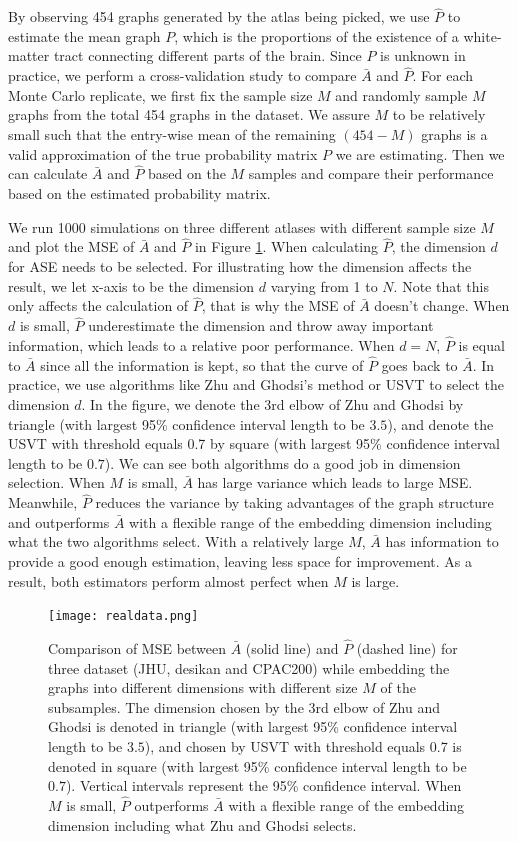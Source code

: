\documentclass[a4paper]{article}
\begin{document}
By observing 454 graphs generated by the atlas being picked, we use $\hat{P}$ to estimate the mean graph $P$, which is the proportions of the existence of a white-matter tract connecting different parts of the brain. Since $P$ is unknown in practice, we perform a cross-validation study to compare $\bar{A}$ and $\hat{P}$. For each Monte Carlo replicate, we first fix the sample size $M$ and randomly sample $M$ graphs from the total 454 graphs in the dataset. We assure $M$ to be relatively small such that the entry-wise mean of the remaining $(454 - M)$ graphs is a valid approximation of the true probability matrix $P$ we are estimating. Then we can calculate $\bar{A}$ and $\hat{P}$ based on the $M$ samples and compare their performance based on the estimated probability matrix.

We run 1000 simulations on three different atlases with different sample size $M$ and plot the MSE of $\bar{A}$ and $\hat{P}$ in Figure \ref{fig:realdata}. When calculating $\hat{P}$, the dimension $d$ for ASE needs to be selected. For illustrating how the dimension affects the result, we let x-axis to be the dimension $d$ varying from 1 to $N$. Note that this only affects the calculation of $\hat{P}$, that is why the MSE of $\bar{A}$ doesn't change. When $d$ is small, $\hat{P}$ underestimate the dimension and throw away important information, which leads to a relative poor performance. When $d=N$, $\hat{P}$ is equal to $\bar{A}$ since all the information is kept, so that the curve of $\hat{P}$ goes back to $\bar{A}$. In practice, we use algorithms like Zhu and Ghodsi's method or USVT to select the dimension $d$. In the figure, we denote the 3rd elbow of Zhu and Ghodsi by triangle (with largest 95\% confidence interval length to be $3.5$), and denote the USVT with threshold equals 0.7 by square (with largest 95\% confidence interval length to be $0.7$). We can see both algorithms do a good job in dimension selection. When $M$ is small, $\bar{A}$ has large variance which leads to large MSE. Meanwhile, $\hat{P}$ reduces the variance by taking advantages of the graph structure and outperforms $\bar{A}$ with a flexible range of the embedding dimension including what the two algorithms select. With a relatively large $M$, $\bar{A}$ has information to provide a good enough estimation, leaving less space for improvement. As a result, both estimators perform almost perfect when $M$ is large.

\begin{figure}[!htb]
\centering
\texttt{[image: realdata.png]}
\caption{Comparison of MSE between $\bar{A}$ (solid line) and $\hat{P}$ (dashed line) for three dataset (JHU, desikan and CPAC200) while embedding the graphs into different dimensions with different size $M$ of the subsamples. The dimension chosen by the 3rd elbow of Zhu and Ghodsi is denoted in triangle (with largest 95\% confidence interval length to be $3.5$), and chosen by USVT with threshold equals 0.7 is denoted in square (with largest 95\% confidence interval length to be $0.7$).  Vertical intervals represent the 95\% confidence interval.  When $M$ is small, $\hat{P}$ outperforms $\bar{A}$ with a flexible range of the embedding dimension including what Zhu and Ghodsi selects.}
\label{fig:realdata}
\end{figure}
\end{document}
